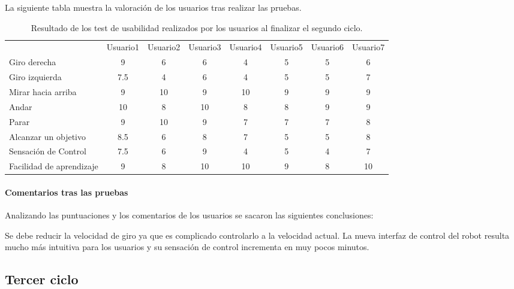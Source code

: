 \documentclass[twoside, 11pt]{epstfg}
\begin{document}
La siguiente tabla muestra la valoración de los usuarios tras realizar las pruebas.
\begin{center}
\begin{table}[h!]
\small

\begin{tabular}{|g  c  c  c  c  c  c  c |}
		\hline
	 \\ \hline
	& Usuario1 & Usuario2 & Usuario3 & Usuario4 & Usuario5 & Usuario6 & Usuario7\\
	 
	Giro derecha & 9 & 6 & 6 & 4 & 5 & 5 & 6\\
	Giro izquierda & 7.5 & 4 & 6 & 4 & 5 & 5 & 7\\
	Mirar hacia arriba & 9 & 10 & 9 & 10 & 9 & 9 & 9\\
	Andar & 10 & 8 & 10 & 8 & 8 & 9 & 9\\
	Parar & 9 & 10 & 9 & 7 & 7 & 7 & 8\\
	Alcanzar un objetivo & 8.5 & 6 & 8 & 7 & 5 & 5 & 8\\
	Sensación de Control & 7.5 & 6 & 9 & 4 & 5 & 4 & 7\\
	Facilidad de aprendizaje & 9 & 8 & 10 & 10 & 9 & 8 & 10\\
	\hline
\end{tabular}
\caption{Resultado de los test de usabilidad realizados por los usuarios al finalizar el segundo ciclo.}
\end{table}
\end{center}

\paragraph{Comentarios tras las pruebas}

Analizando las puntuaciones y los comentarios de los usuarios se sacaron las siguientes conclusiones:

Se debe reducir la velocidad de giro ya que es complicado controlarlo a la velocidad actual.
La nueva interfaz de control del robot resulta mucho más intuitiva para los usuarios y su sensación de control incrementa en muy pocos minutos.

\subsection{Tercer ciclo}
\end{document}

